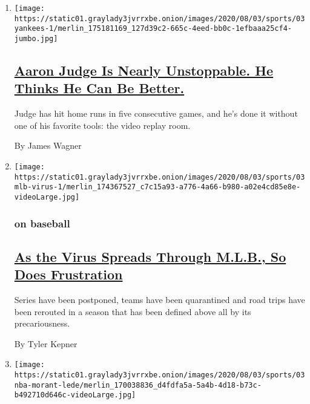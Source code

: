 \begin{enumerate}
\def\labelenumi{\arabic{enumi}.}
\item
  \texttt{[image: https://static01.graylady3jvrrxbe.onion/images/2020/08/03/sports/03yankees-1/merlin\_175181169\_127d39c2-665c-4eed-bb0c-1efbaaa25cf4-jumbo.jpg]}

  \hypertarget{aaron-judge-is-nearly-unstoppable-he-thinks-he-can-be-better}{%
  \subsection{\texorpdfstring{\href{/2020/08/03/sports/baseball/aaron-judge-yankees.html}{Aaron
  Judge Is Nearly Unstoppable. He Thinks He Can Be
  Better.}}{Aaron Judge Is Nearly Unstoppable. He Thinks He Can Be Better.}}\label{aaron-judge-is-nearly-unstoppable-he-thinks-he-can-be-better}}

  Judge has hit home runs in five consecutive games, and he's done it
  without one of his favorite tools: the video replay room.

  By James Wagner
\item
  \texttt{[image: https://static01.graylady3jvrrxbe.onion/images/2020/08/03/sports/03mlb-virus-1/merlin\_174367527\_c7c15a93-a776-4a66-b980-a02e4cd85e8e-videoLarge.jpg]}

  \hypertarget{on-baseball}{%
  \subsubsection{on baseball}\label{on-baseball}}

  \hypertarget{as-the-virus-spreads-through-mlb-so-does-frustration}{%
  \subsection{\texorpdfstring{\href{/2020/08/03/sports/baseball/mlb-coronavirus-outbreak.html}{As
  the Virus Spreads Through M.L.B., So Does
  Frustration}}{As the Virus Spreads Through M.L.B., So Does Frustration}}\label{as-the-virus-spreads-through-mlb-so-does-frustration}}

  Series have been postponed, teams have been quarantined and road trips
  have been rerouted in a season that has been defined above all by its
  precariousness.

  By Tyler Kepner
\item
  \texttt{[image: https://static01.graylady3jvrrxbe.onion/images/2020/08/03/sports/03nba-morant-lede/merlin\_170038836\_d4fdfa5a-5a4b-4d18-b73c-b492710d646c-videoLarge.jpg]}


\end{enumerate}
